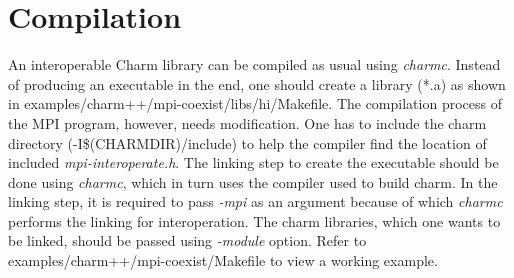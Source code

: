 \section{Compilation}
An interoperable Charm library can be compiled as usual using {\em charmc}.
Instead of producing an executable in the end, one should create a library (*.a)
as shown in examples/charm++/mpi-coexist/libs/hi/Makefile. The compilation
process of the MPI program, however, needs modification. One has to include the
charm directory (-I\$(CHARMDIR)/include) to help the compiler find the location of
included {\em mpi-interoperate.h}. The linking step to create the executable
should be done using {\em charmc}, which in turn uses the compiler used to build
charm. In the linking step, it is required to pass {\em -mpi} as an argument
because of which {\em charmc} performs the linking for interoperation. The charm
libraries, which one wants to be linked, should be passed using {\em -module}
option. Refer to examples/charm++/mpi-coexist/Makefile to view a working
example.


